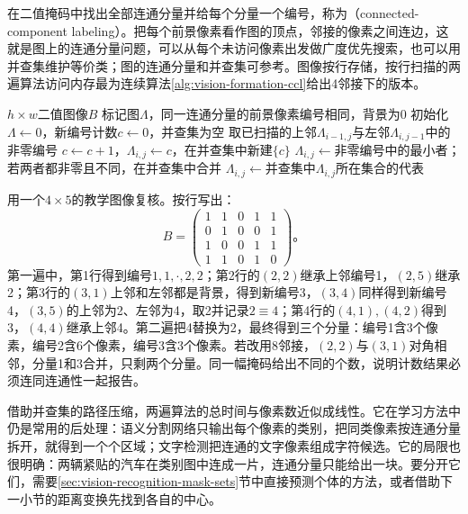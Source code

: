 在二值掩码中找出全部连通分量并给每个分量一个编号，称为（connected-component labeling）。把每个前景像素看作图的顶点，邻接的像素之间连边，这就是图上的连通分量问题，可以从每个未访问像素出发做广度优先搜索，也可以用并查集维护等价类；图的连通分量和并查集可参考。图像按行存储，按行扫描的两遍算法访问内存最为连续算法\ref{alg:vision-formation-ccl}给出4邻接下的版本。

\begin{algorithm}[两遍扫描的连通分量标记（4邻接）]
  \label{alg:vision-formation-ccl}
  \begin{algorithmic}[1]
    \Require $h\times w$二值图像$B$
    \Ensure 标记图$\Lambda$，同一连通分量的前景像素编号相同，背景为$0$
    \State 初始化$\Lambda\gets0$，新编号计数$c\gets0$，并查集为空
          \State 取已扫描的上邻$\Lambda_{i-1,j}$与左邻$\Lambda_{i,j-1}$中的非零编号
            \State $c\gets c+1$，$\Lambda_{i,j}\gets c$，在并查集中新建$\{c\}$
          \Else
            \State $\Lambda_{i,j}\gets$非零编号中的最小者；若两者都非零且不同，在并查集中合并
          \EndIf
        \EndIf
      \EndFor
    \EndFor
      \State $\Lambda_{i,j}\gets$并查集中$\Lambda_{i,j}$所在集合的代表
    \EndFor
  \end{algorithmic}
\end{algorithm}

用一个$4\times5$的教学图像复核。按行写出：
\[
  B=\begin{pmatrix}
    1&1&0&1&1\\
    0&1&0&0&1\\
    1&0&0&1&1\\
    1&1&0&1&0
  \end{pmatrix}\text{。}
\]
第一遍中，第1行得到编号$1,1,\cdot,2,2$；第2行的$(2,2)$继承上邻编号1，$(2,5)$继承2；第3行的$(3,1)$上邻和左邻都是背景，得到新编号3，$(3,4)$同样得到新编号4，$(3,5)$的上邻为2、左邻为4，取2并记录$2\equiv4$；第4行的$(4,1),(4,2)$得到3，$(4,4)$继承上邻4。第二遍把4替换为2，最终得到三个分量：编号1含3个像素，编号2含6个像素，编号3含3个像素。若改用8邻接，$(2,2)$与$(3,1)$对角相邻，分量1和3合并，只剩两个分量。同一幅掩码给出不同的个数，说明计数结果必须连同连通性一起报告。

借助并查集的路径压缩，两遍算法的总时间与像素数近似成线性。它在学习方法中仍是常用的后处理：语义分割网络只输出每个像素的类别，把同类像素按连通分量拆开，就得到一个个区域；文字检测把连通的文字像素组成字符候选。它的局限也很明确：两辆紧贴的汽车在类别图中连成一片，连通分量只能给出一块。要分开它们，需要\ref{sec:vision-recognition-mask-sets}节中直接预测个体的方法，或者借助下一小节的距离变换先找到各自的中心。

